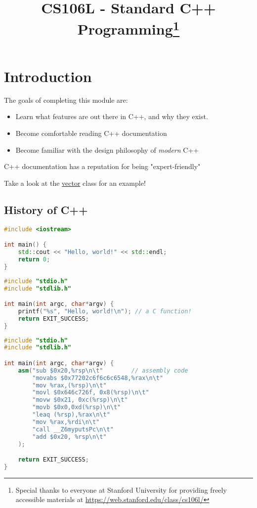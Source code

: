 \documentclass[12pt]{article}
\title{CS106L - Standard C++ Programming\thanks{Special thanks to everyone at Stanford University for providing freely accessible materials at \href{https://web.stanford.edu/class/cs106l/}{https://web.stanford.edu/class/cs106l/}}}
\begin{document}
\maketitle
\tableofcontents

\section{Introduction}

The goals of completing this module are:
\begin{itemize}
    \item Learn what features are out there in C++, and why they exist.
    \item Become comfortable reading C++ documentation
    \item Become familiar with the design philosophy of \emph{modern} C++
\end{itemize}

C++ documentation has a reputation for being "expert-friendly"

\begin{note}
Take a look at the \href{https://en.cppreference.com/w/cpp/container/vector}{vector} class for an example!
\end{note}

\subsection{History of C++}

\begin{minipage}{\linewidth} %
\begin{lstlisting}[language=C++, caption="Some C++ Code", breaklines=false]
#include <iostream>

int main() {
    std::cout << "Hello, world!" << std::endl;
    return 0;
}
\end{lstlisting}
\end{minipage}

\begin{lstlisting}[language=C++, caption="Also some C++ Code", breaklines=false]
#include "stdio.h"
#include "stdlib.h"

int main(int argc, char*argv) {
    printf("%s", "Hello, world!\n"); // a C function!
    return EXIT_SUCCESS;
}
\end{lstlisting}

\begin{lstlisting}[language=C++, caption="Also (technically) some C++ Code", breaklines=false]
#include "stdio.h"
#include "stdlib.h"

int main(int argc, char*argv) {
    asm("sub $0x20,%rsp\n\t"        // assembly code
        "movabs $0x77202c6f6c6c6548,%rax\n\t"
        "mov %rax,(%rsp)\n\t"
        "movl $0x646c726f, 0x8(%rsp)\n\t"
        "movw $0x21, 0xc(%rsp)\n\t"
        "movb $0x0,0xd(%rsp)\n\t"
        "leaq (%rsp),%rax\n\t"
        "mov %rax,%rdi\n\t"
        "call __Z6myputsPc\n\t"
        "add $0x20, %rsp\n\t"
    );

    return EXIT_SUCCESS;
}
\end{lstlisting}
\end{document}
